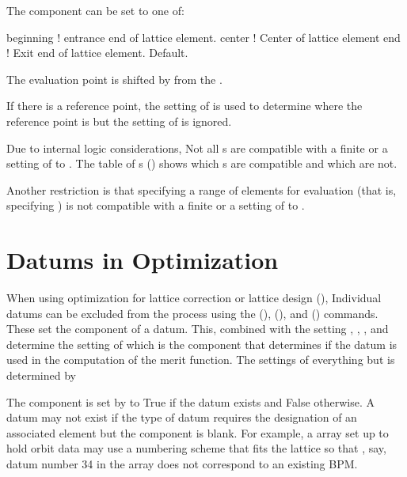 The  component can be set to one of:
\begin{example}
  beginning   ! entrance end of lattice element.
  center      ! Center of lattice element
  end         ! Exit end of lattice element. Default.
\end{example}
The evaluation point is shifted by  from the .

If there is a reference point, the setting of  is used to determine where
the reference point is but the setting of  is ignored.

Due to internal logic considerations, Not all s are compatible with a finite
 or a setting of  to . The table of s
() shows which s are compatible and which are not.

Another restriction is that specifying a range of elements for evaluation (that is,
specifying  ) is not compatible with a finite
 or a setting of  to .

\section{Datums in Optimization}
\label{s:datum.opt}

When using optimization for lattice correction or lattice design
(), Individual datums can be excluded from the process
using the  (),  (),
and  () commands. These set the 
component of a datum. This, combined with the setting ,
, , and 
determine the setting of  which is the component that
determines if the datum is used in the computation of the merit
function. The settings of everything but  is determined
by \tao

The  component is set by \tao to True if the datum exists
and False otherwise. A datum may not exist if the type of datum
requires the designation of an associated element but the
 component is blank. For example, a  array
set up to hold orbit data may use a numbering scheme that fits the
lattice so that , say, datum number 34 in the array does not
correspond to an existing BPM.

